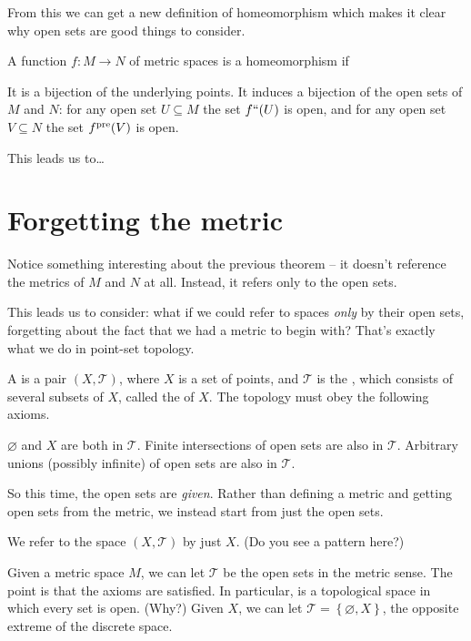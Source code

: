 From this we can get a new definition of homeomorphism
which makes it clear why open sets are good things to consider.
\begin{theorem}
	A function $f : M \to N$ of metric spaces is a homeomorphism if 
	\begin{enumerate}[(i)]
		\ii It is a bijection of the underlying points.
		\ii It induces a bijection of the open sets of $M$ and $N$:
		for any open set $U \subseteq M$ the set $f``(U)$ is open,
		and for any open set $V \subseteq N$ the set $f^{\text{pre}}(V)$ is open.
	\end{enumerate}
\end{theorem}

This leads us to\dots

\section{Forgetting the metric}
Notice something interesting about the previous theorem -- it doesn't reference the metrics of $M$ and $N$ at all.
Instead, it refers only to the open sets.

This leads us to consider: what if we could refer to spaces \emph{only} by their open sets, forgetting about the fact that we had a metric to begin with?
That's exactly what we do in point-set topology.

\begin{definition}
	A  is a pair $(X, \mathcal T)$,
	where $X$ is a set of points,
	and $\mathcal T$ is the , which consists of several subsets of $X$, called the  of $X$.
	The topology must obey the following axioms.
	\begin{itemize}
		\ii $\varnothing$ and $X$ are both in $\mathcal T$.
		\ii Finite intersections of open sets are also in $\mathcal T$.
		\ii Arbitrary unions (possibly infinite) of open sets are also in $\mathcal T$.
	\end{itemize}
\end{definition}
So this time, the open sets are \emph{given}.
Rather than defining a metric and getting open sets from the metric,
we instead start from just the open sets.
\begin{abuse}
	We refer to the space $(X, \mathcal T)$ by just $X$.
	(Do you see a pattern here?)
\end{abuse}

\begin{example}
	\listhack
	\begin{enumerate}[(a)]
		\ii Given a metric space $M$, we can let $\mathcal T$ be
		the open sets in the metric sense.
		The point is that the axioms are satisfied.
		\ii In particular,  is a topological space in which every set is open. (Why?)
		\ii Given $X$, we can let $\mathcal T = \left\{ \varnothing, X \right\}$,
		the opposite extreme of the discrete space.
	\end{enumerate}
\end{example}

